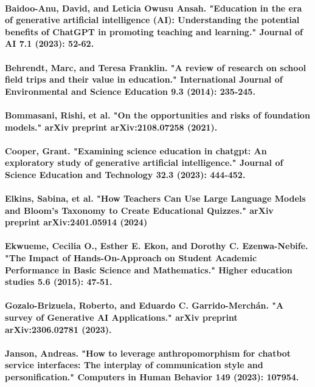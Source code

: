 \documentclass{article}
\begin{document}
\paragraph{Baidoo-Anu, David, and Leticia Owusu Ansah. "Education in the era of generative artificial intelligence (AI): Understanding the potential benefits of ChatGPT in promoting teaching and learning." Journal of AI 7.1 (2023): 52-62.}
\paragraph{Behrendt, Marc, and Teresa Franklin. "A review of research on school field trips and their value in education." International Journal of Environmental and Science Education 9.3 (2014): 235-245. }
\paragraph{Bommasani, Rishi, et al. "On the opportunities and risks of foundation models." arXiv preprint arXiv:2108.07258 (2021).}
\paragraph{Cooper, Grant. "Examining science education in chatgpt: An exploratory study of generative artificial intelligence." Journal of Science Education and Technology 32.3 (2023): 444-452. }
\paragraph{Elkins, Sabina, et al. "How Teachers Can Use Large Language Models and Bloom's Taxonomy to Create Educational Quizzes." arXiv preprint arXiv:2401.05914 (2024)}
\paragraph{Ekwueme, Cecilia O., Esther E. Ekon, and Dorothy C. Ezenwa-Nebife. "The Impact of Hands-On-Approach on Student Academic Performance in Basic Science and Mathematics." Higher education studies 5.6 (2015): 47-51.}
\paragraph{Gozalo-Brizuela, Roberto, and Eduardo C. Garrido-Merchán. "A survey of Generative AI Applications." arXiv preprint arXiv:2306.02781 (2023).}
\paragraph{Janson, Andreas. "How to leverage anthropomorphism for chatbot service interfaces: The interplay of communication style and personification." Computers in Human Behavior 149 (2023): 107954.}
\end{document}
